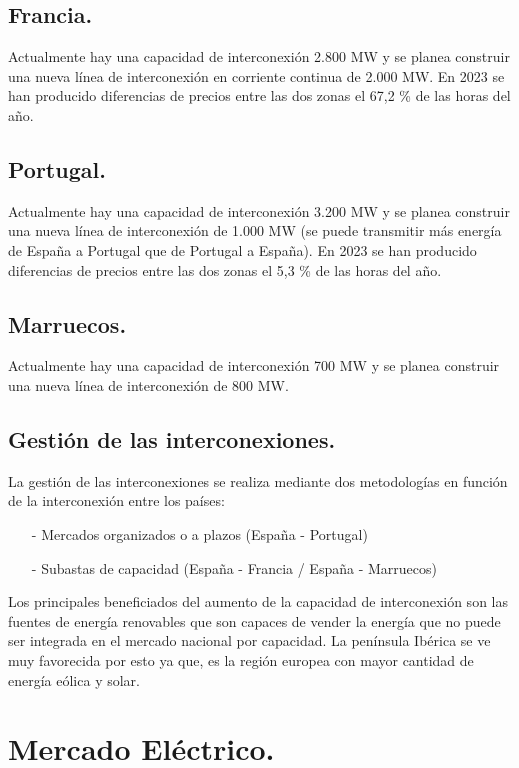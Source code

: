 \subsection{Francia.}
Actualmente hay una capacidad de interconexión 2.800 MW y se planea construir una nueva línea de interconexión en corriente continua de 2.000 MW. En 2023 se han producido diferencias de
precios entre las dos zonas el 67,2 \% de las horas
del año.
\subsection{Portugal.}
Actualmente hay una capacidad de interconexión 3.200 MW   y se planea construir una nueva línea de interconexión de 1.000 MW (se puede transmitir más energía de España a Portugal que de Portugal a España). En 2023 se han producido diferencias de
precios entre las dos zonas el 5,3 \% de las horas
del año.
\subsection{Marruecos.}
Actualmente hay una capacidad de interconexión 700 MW   y se planea construir una nueva línea de interconexión de 800 MW.
\subsection{Gestión de las interconexiones.}
La gestión de las interconexiones se realiza mediante dos metodologías en función de la interconexión entre los países:
\begin{itemize}
	\item [-] Mercados organizados o a plazos (España - Portugal)
	\item [-] Subastas de capacidad (España - Francia / España - Marruecos)
\end{itemize}
Los principales beneficiados del aumento de la capacidad de interconexión son las fuentes de energía renovables que son capaces de vender la energía que no puede ser integrada en el mercado nacional por capacidad. La península Ibérica se ve muy favorecida por esto ya que, es la región europea con mayor cantidad de energía eólica y solar.
\newpage
\section{Mercado Eléctrico.}
